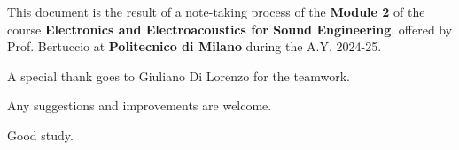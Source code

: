 \setcounter{page}{0}
\thispagestyle{nohead}

\vspace*{\fill}
\begin{center}
This document is the result of a note-taking process of the \textbf{Module 2} of the course \textbf{ Electronics and Electroacoustics for Sound Engineering}, offered by Prof. Bertuccio at \textbf{Politecnico di Milano} during the A.Y. 2024-25.

A special thank goes to Giuliano Di Lorenzo for the teamwork.

Any suggestions and improvements are welcome.

Good study.

\end{center}

\vspace*{\fill}

\clearpage
